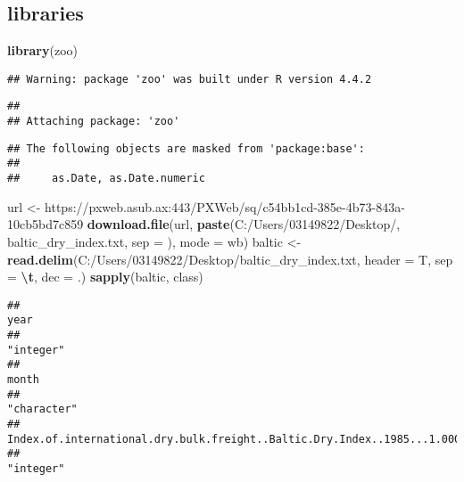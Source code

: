 \documentclass[
]{article}
\newenvironment{Shaded}{\begin{snugshade}}{\end{snugshade}}
\newcommand{\AttributeTok}[1]{\textcolor[rgb]{0.13,0.29,0.53}{#1}}
\newcommand{\FunctionTok}[1]{\textcolor[rgb]{0.13,0.29,0.53}{\textbf{#1}}}
\newcommand{\NormalTok}[1]{#1}
\newcommand{\OtherTok}[1]{\textcolor[rgb]{0.56,0.35,0.01}{#1}}
\newcommand{\SpecialCharTok}[1]{\textcolor[rgb]{0.81,0.36,0.00}{\textbf{#1}}}
\newcommand{\StringTok}[1]{\textcolor[rgb]{0.31,0.60,0.02}{#1}}
\begin{document}
\subsection{libraries}\label{libraries}

\begin{Shaded}
\begin{Highlighting}[]
\FunctionTok{library}\NormalTok{(zoo)}
\end{Highlighting}
\end{Shaded}

\begin{verbatim}
## Warning: package 'zoo' was built under R version 4.4.2
\end{verbatim}

\begin{verbatim}
## 
## Attaching package: 'zoo'
\end{verbatim}

\begin{verbatim}
## The following objects are masked from 'package:base':
## 
##     as.Date, as.Date.numeric
\end{verbatim}

\begin{Shaded}
\begin{Highlighting}[]
\NormalTok{url }\OtherTok{\textless{}{-}} \StringTok{\textquotesingle{}https://pxweb.asub.ax:443/PXWeb/sq/c54bb1cd{-}385e{-}4b73{-}843a{-}10cb5bd7c859\textquotesingle{}}
\FunctionTok{download.file}\NormalTok{(url, }\FunctionTok{paste}\NormalTok{(}\StringTok{\textquotesingle{}C:/Users/03149822/Desktop/\textquotesingle{}}\NormalTok{, }\StringTok{\textquotesingle{}baltic\_dry\_index.txt\textquotesingle{}}\NormalTok{, }\AttributeTok{sep =} \StringTok{\textquotesingle{}\textquotesingle{}}\NormalTok{), }\AttributeTok{mode =} \StringTok{\textquotesingle{}wb\textquotesingle{}}\NormalTok{)}
\NormalTok{baltic }\OtherTok{\textless{}{-}} \FunctionTok{read.delim}\NormalTok{(}\StringTok{\textquotesingle{}C:/Users/03149822/Desktop/baltic\_dry\_index.txt\textquotesingle{}}\NormalTok{, }\AttributeTok{header =}\NormalTok{ T, }\AttributeTok{sep =} \StringTok{\textquotesingle{}}\SpecialCharTok{\textbackslash{}t}\StringTok{\textquotesingle{}}\NormalTok{, }\AttributeTok{dec =} \StringTok{\textquotesingle{}.\textquotesingle{}}\NormalTok{)}
\FunctionTok{sapply}\NormalTok{(baltic, class)}
\end{Highlighting}
\end{Shaded}

\begin{verbatim}
##                                                                     year 
##                                                                "integer" 
##                                                                    month 
##                                                              "character" 
## Index.of.international.dry.bulk.freight..Baltic.Dry.Index..1985...1.000. 
##                                                                "integer"
\end{verbatim}
\end{document}
